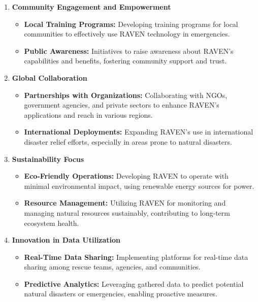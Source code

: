 {\begin{enumerate}[label=\textbf{\arabic*}., leftmargin=*]
		\item \textbf{Community Engagement and Empowerment}
		\begin{itemize}
			\item \textbf{Local Training Programs:} Developing training programs for local communities to
			effectively use RAVEN technology in emergencies.
			\item \textbf{Public Awareness:} Initiatives to raise awareness about RAVEN’s capabilities and
			benefits, fostering community support and trust.
		\end{itemize}
		
		\item \textbf{Global Collaboration}
		\begin{itemize}
			\item \textbf{Partnerships with Organizations:} Collaborating with NGOs, government agencies,
			and private sectors to enhance RAVEN’s applications and reach in various regions.
			\item \textbf{International Deployments:} Expanding RAVEN’s use in international disaster relief
			efforts, especially in areas prone to natural disasters.
		\end{itemize}
		
		\item \textbf{Sustainability Focus}
		\begin{itemize}
			\item \textbf{Eco-Friendly Operations:} Developing RAVEN to operate with minimal
			environmental impact, using renewable energy sources for power.
			\item \textbf{Resource Management:} Utilizing RAVEN for monitoring and managing natural
			resources sustainably, contributing to long-term ecosystem health.
		\end{itemize}
		
		\item \textbf{Innovation in Data Utilization}
		\begin{itemize}
			\item \textbf{Real-Time Data Sharing:} Implementing platforms for real-time data sharing among
			rescue teams, agencies, and communities.
			\item \textbf{Predictive Analytics:} Leveraging gathered data to predict potential natural disasters or
			emergencies, enabling proactive measures.
		\end{itemize}
	\end{enumerate}
}